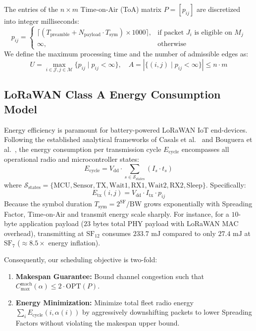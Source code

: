 \documentclass{article}
\begin{document}
The entries of the $n \times m$ Time-on-Air (ToA) matrix $P = [p_{ij}]$ are discretized into integer milliseconds:
\begin{equation}
p_{ij} = \begin{cases}
\lceil (T_{\text{preamble}} + N_{\text{payload}} \cdot T_{\text{sym}}) \times 1000 \rceil, & \text{if packet } J_i \text{ is eligible on } M_j \\
\infty, & \text{otherwise}
\end{cases}
\end{equation}
We define the maximum processing time and the number of admissible edges as:
\begin{equation}
U = \max_{i \in \mathcal{J}, j \in \mathcal{M}} \{ p_{ij} \mid p_{ij} < \infty \}, \quad A = |\{(i, j) \mid p_{ij} < \infty\}| \le n \cdot m
\end{equation}

\subsection{LoRaWAN Class A Energy Consumption Model}
\label{subsec:energy_model}
Energy efficiency is paramount for battery-powered LoRaWAN IoT end-devices. Following the established analytical frameworks of Casals et al.~\cite{casals2017modeling} and Bouguera et al.~\cite{bouguera2018energy}, the energy consumption per transmission cycle $E_{\text{cycle}}$ encompasses all operational radio and microcontroller states:
\begin{equation}
E_{\text{cycle}} = V_{\text{dd}} \cdot \sum_{s \in \mathcal{S}_{\text{states}}} \left( I_s \cdot t_s \right)
\end{equation}
where $\mathcal{S}_{\text{states}} = \{\text{MCU}, \text{Sensor}, \text{TX}, \text{Wait1}, \text{RX1}, \text{Wait2}, \text{RX2}, \text{Sleep}\}$. Specifically:
\begin{equation}
E_{\text{tx}}(i, j) = V_{\text{dd}} \cdot I_{\text{tx}} \cdot p_{ij}
\end{equation}
Because the symbol duration $T_{\text{sym}} = 2^{\text{SF}} / \text{BW}$ grows exponentially with Spreading Factor, Time-on-Air and transmit energy scale sharply. For instance, for a $10$-byte application payload ($23$ bytes total PHY payload with LoRaWAN MAC overhead), transmitting at $\text{SF}_{12}$ consumes $233.7\text{ mJ}$ compared to only $27.4\text{ mJ}$ at $\text{SF}_7$ ($\approx 8.5\times$ energy inflation).

Consequently, our scheduling objective is two-fold:
\begin{enumerate}
    \item \textbf{Makespan Guarantee:} Bound channel congestion such that $C_{\max}^{\text{mach}}(\alpha) \le 2 \cdot \text{OPT}(P)$.
    \item \textbf{Energy Minimization:} Minimize total fleet radio energy $\sum_{i} E_{\text{cycle}}(i, \alpha(i))$ by aggressively downshifting packets to lower Spreading Factors without violating the makespan upper bound.
\end{enumerate}
\end{document}
